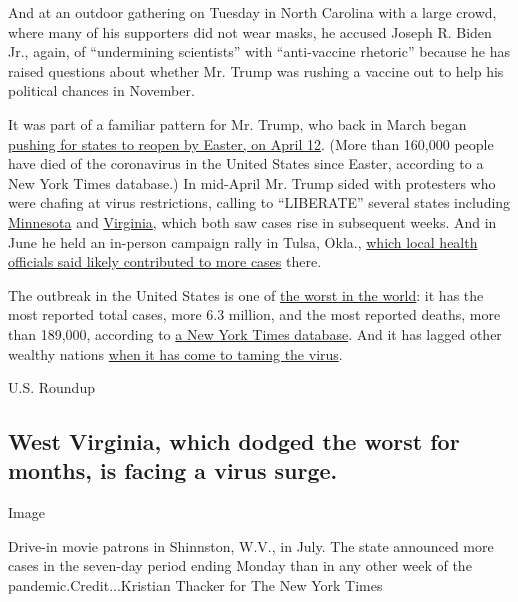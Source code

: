 And at an outdoor gathering on Tuesday in North Carolina with a large
crowd, where many of his supporters did not wear masks, he accused
Joseph R. Biden Jr., again, of ``undermining scientists'' with
``anti-vaccine rhetoric'' because he has raised questions about whether
Mr. Trump was rushing a vaccine out to help his political chances in
November.

It was part of a familiar pattern for Mr. Trump, who back in March began
\href{https://www.nytimes3xbfgragh.onion/2020/03/24/us/politics/trump-coronavirus-easter.html}{pushing
for states to reopen by Easter, on April 12}. (More than 160,000 people
have died of the coronavirus in the United States since Easter,
according to a New York Times database.) In mid-April Mr. Trump sided
with protesters who were chafing at virus restrictions, calling to
``LIBERATE'' several states including
\href{https://twitter.com/realDonaldTrump/status/1251168994066944003}{Minnesota}
and
\href{https://twitter.com/realDonaldTrump/status/1251169987110330372}{Virginia},
which both saw cases rise in subsequent weeks. And in June he held an
in-person campaign rally in Tulsa, Okla.,
\href{https://www.nytimes3xbfgragh.onion/2020/07/08/us/politics/coronavirus-tulsa-trump-rally.html}{which
local health officials said likely contributed to more cases} there.

The outbreak in the United States is one of
\href{https://www.nytimes3xbfgragh.onion/interactive/2020/world/coronavirus-maps.html}{the
worst in the world}: it has the most reported total cases, more 6.3
million, and the most reported deaths, more than 189,000, according to
\href{https://www.nytimes3xbfgragh.onion/interactive/2020/us/coronavirus-us-cases.html}{a
New York Times database}. And it has lagged other wealthy nations
\href{https://www.nytimes3xbfgragh.onion/2020/08/06/us/coronavirus-us.html}{when
it has come to taming the virus}.

U.S. Roundup

\hypertarget{west-virginia-which-dodged-the-worst-for-months-is-facing-a-virus-surge}{%
\subsection{West Virginia, which dodged the worst for months, is facing
a virus
surge.}\label{west-virginia-which-dodged-the-worst-for-months-is-facing-a-virus-surge}}

Image

Drive-in movie patrons in Shinnston, W.V., in July. The state announced
more cases in the seven-day period ending Monday than in any other week
of the pandemic.Credit...Kristian Thacker for The New York Times

